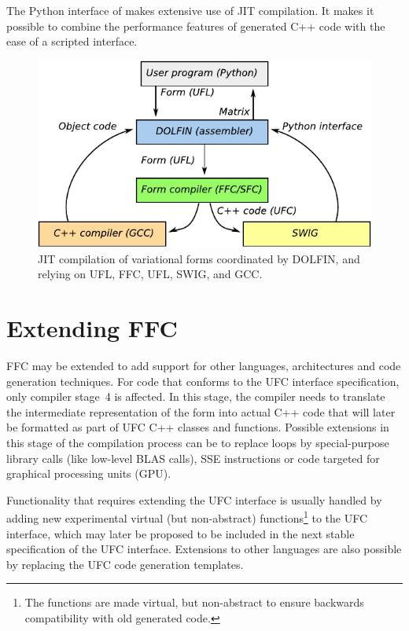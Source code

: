 The Python interface of \dolfin{} makes extensive use of JIT
compilation. It makes it possible to combine the performance features
of generated C++ code with the ease of a scripted interface.

\begin{figure}
  \centering
  \includegraphics[width=\largefig]{chapters/logg-1/pdf/jit.pdf}
  \caption{JIT compilation of variational forms coordinated by
    DOLFIN, and relying on UFL, FFC, UFL, SWIG, and GCC.}
  \label{fig:logg-1:jit}
\end{figure}

\section{Extending FFC}

FFC may be extended to add support for other languages, architectures
and code generation techniques. For code that conforms to the UFC
interface specification, only compiler stage~4 is affected. In this
stage, the compiler needs to translate the intermediate representation
of the form into actual C++ code that will later be formatted as part
of UFC C++ classes and functions. Possible extensions in this stage of
the compilation process can be to replace loops by special-purpose
library calls (like low-level BLAS calls), SSE instructions or code
targeted for graphical processing units (GPU).

Functionality that requires extending the UFC interface is usually
handled by adding new experimental virtual (but non-abstract)
functions\footnote{The functions are made virtual, but non-abstract to
  ensure backwards compatibility with old generated code.} to the UFC
interface, which may later be proposed to be included in the next
stable specification of the UFC interface. Extensions to other
languages are also possible by replacing the UFC code generation
templates.

